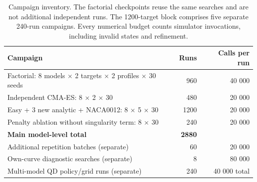 \begin{table}[H]
\caption{Campaign inventory. The factorial checkpoints reuse the same searches and are not additional independent runs. The 1200-target block comprises five separate 240-run campaigns. Every numerical budget counts simulator invocations, including invalid states and refinement.}
\label{tab:v3_campaigns}
\centering
\small
\begin{tabular}{@{}p{9.0cm}rr@{}}
\toprule
Campaign & Runs & Calls per run \\
\midrule
Factorial: 8 models $\times$ 2 targets $\times$ 2 profiles $\times$ 30 seeds & 960 & 40 000 \\
Independent CMA-ES: 8 $\times$ 2 $\times$ 30 & 480 & 20 000 \\
Easy + 3 new analytic + NACA0012: 8 $\times$ 5 $\times$ 30 & 1200 & 20 000 \\
Penalty ablation without singularity term: 8 $\times$ 30 & 240 & 20 000 \\
\textbf{Main model-level total} & \textbf{2880} &  \\
Additional repetition batches (separate) & 60 & 20 000 \\
Own-curve diagnostic searches (separate) & 8 & 80 000 \\
Multi-model QD policy/grid runs (separate) & 240 & 40 000 total \\
\bottomrule
\end{tabular}
\end{table}
